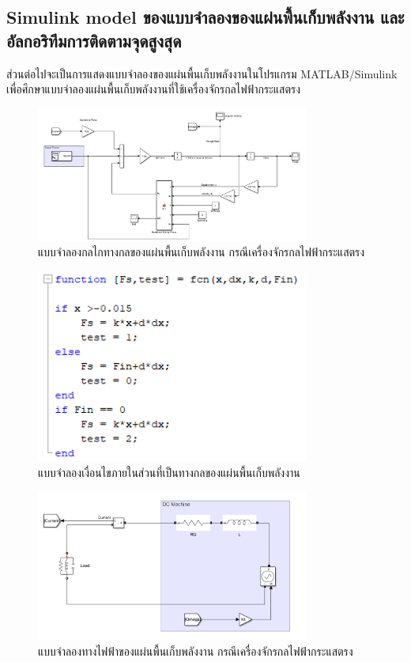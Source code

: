 \documentclass[11pt,a4paper]{article}
\begin{document}
\subsection{Simulink model ของแบบจำลองของแผ่นพื้นเก็บพลังงาน และอัลกอริทึมการติดตามจุดสูงสุด}
ส่วนต่อไปจะเป็นการแสดงแบบจำลองของแผ่นพื้นเก็บพลังงานในโปรแกรม MATLAB/Simulink เพื่อศึกษาแบบจำลองแผ่นพื้นเก็บพลังงานที่ใช้เครื่องจักรกลไฟฟ้ากระแสตรง
\begin{figure}[H]
    \centering
    \includegraphics[width=0.8\textwidth]{mech_model_dc.png}
    \caption{แบบจำลองกลไกทางกลของแผ่นพื้นเก็บพลังงาน กรณีเครื่องจักรกลไฟฟ้ากระแสตรง}
\end{figure}
\begin{figure}[H]
    \centering
    \includegraphics[width=0.8\textwidth]{condition_mech.png}
    \caption{แบบจำลองเงื่อนไขภายในส่วนที่เป็นทางกลของแผ่นพื้นเก็บพลังงาน}
\end{figure}
\begin{figure}[H]
    \centering
    \includegraphics[width=0.8\textwidth]{elec_model_dc.png}
    \caption{แบบจำลองทางไฟฟ้าของแผ่นพื้นเก็บพลังงาน กรณีเครื่องจักรกลไฟฟ้ากระแสตรง}
\end{figure}
\end{document}
